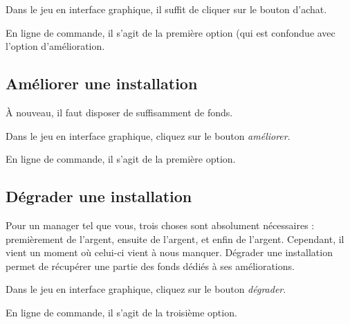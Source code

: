 Dans le jeu en interface graphique, il suffit de cliquer sur le bouton d'achat.

En ligne de commande, il s'agit de la première option (qui est confondue avec l'option d'amélioration.

\subsection{Améliorer une installation}
À nouveau, il faut disposer de suffisamment de fonds.

Dans le jeu en interface graphique, cliquez sur le bouton \emph{améliorer}.

En ligne de commande, il s'agit de la première option.

\subsection{Dégrader une installation}
Pour un manager tel que vous, trois choses sont absolument nécessaires : premièrement de l'argent,
ensuite de l'argent, et enfin de l'argent. Cependant, il vient un moment où celui-ci vient à nous 
manquer. Dégrader une installation permet de récupérer une partie des fonds dédiés à ses améliorations.

Dans le jeu en interface graphique, cliquez sur le bouton \emph{dégrader}.

En ligne de commande, il s'agit de la troisième option.

